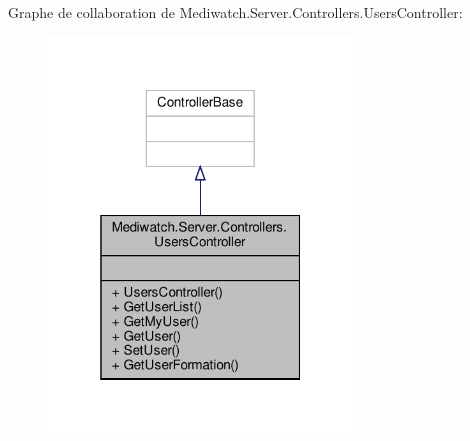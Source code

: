 Graphe de collaboration de Mediwatch.\+Server.\+Controllers.\+Users\+Controller\+:\nopagebreak
\begin{figure}[H]
\begin{center}
\leavevmode
\includegraphics[width=229pt]{class_mediwatch_1_1_server_1_1_controllers_1_1_users_controller__coll__graph}
\end{center}
\end{figure}
